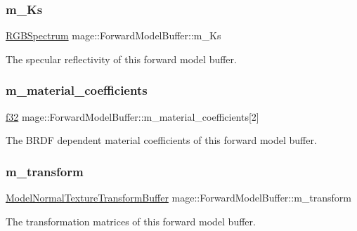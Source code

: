 \subsubsection{\texorpdfstring{m\+\_\+\+Ks}{m\_Ks}}
{\footnotesize\ttfamily \hyperlink{structmage_1_1_r_g_b_spectrum}{R\+G\+B\+Spectrum} mage\+::\+Forward\+Model\+Buffer\+::m\+\_\+\+Ks}

The specular reflectivity of this forward model buffer. \hypertarget{structmage_1_1_forward_model_buffer_a6acd1050a724016b667529ea3b9de9b8}{}\label{structmage_1_1_forward_model_buffer_a6acd1050a724016b667529ea3b9de9b8} 
\subsubsection{\texorpdfstring{m\+\_\+material\+\_\+coefficients}{m\_material\_coefficients}}
{\footnotesize\ttfamily \hyperlink{namespacemage_a6a44ad388483959dc4dff9f2aef91431}{f32} mage\+::\+Forward\+Model\+Buffer\+::m\+\_\+material\+\_\+coefficients\mbox{[}2\mbox{]}}

The B\+R\+DF dependent material coefficients of this forward model buffer. \hypertarget{structmage_1_1_forward_model_buffer_a27b3f08d5ff639d8dcc3878978a2d212}{}\label{structmage_1_1_forward_model_buffer_a27b3f08d5ff639d8dcc3878978a2d212} 
\subsubsection{\texorpdfstring{m\+\_\+transform}{m\_transform}}
{\footnotesize\ttfamily \hyperlink{structmage_1_1_model_normal_texture_transform_buffer}{Model\+Normal\+Texture\+Transform\+Buffer} mage\+::\+Forward\+Model\+Buffer\+::m\+\_\+transform}

The transformation matrices of this forward model buffer. 